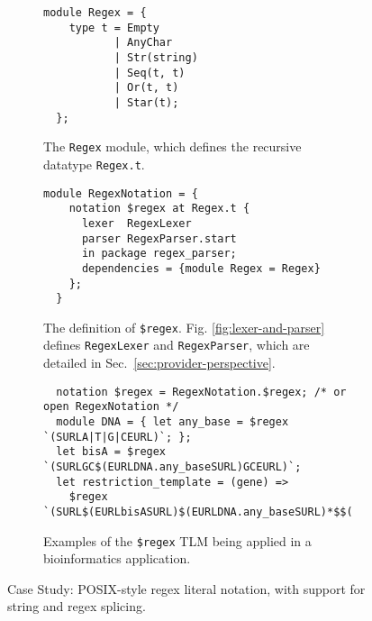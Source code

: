\documentclass[acmsmall]{acmart}
\newcommand{\li}[1]{\lstinline[basicstyle=\ttfamily\fontsize{9pt}{1em}\selectfont]{#1}}
\begin{document}
\begin{figure}[t]
\begin{subfigure}[t]{0.45\textwidth}
\vspace{-4px}
\begin{lstlisting}[mathescape=~]
  module Regex = {
    type t = Empty
           | AnyChar 
           | Str(string)
           | Seq(t, t) 
           | Or(t, t) 
           | Star(t);
  };
\end{lstlisting}
\vspace{-5px}
\caption{The \li{Regex} module, which defines the recursive datatype \li{Regex.t}.}
\label{fig:Regex-module-def}
\end{subfigure}
\hfill
\begin{subfigure}[t]{0.53\textwidth}
\vspace{-4px}
\begin{lstlisting}[mathescape=|]
  module RegexNotation = {
    notation $regex at Regex.t {
      lexer  RegexLexer
      parser RegexParser.start
      in package regex_parser;
      dependencies = {module Regex = Regex}
    };
  }
\end{lstlisting}
\vspace{-5px}
\caption{The definition of \li{$regex}. Fig. \ref{fig:lexer-and-parser} defines \li{RegexLexer} and \li{RegexParser}, which are detailed in Sec.~\ref{sec:provider-perspective}.}
\label{fig:regex-tlm-def}
\end{subfigure}

\begin{subfigure}[t]{\textwidth}
\vspace{7px}
\begin{lstlisting}
  notation $regex = RegexNotation.$regex; /* or open RegexNotation */
  module DNA = { let any_base = $regex `(SURLA|T|G|CEURL)`; };
  let bisA = $regex `(SURLGC$(EURLDNA.any_baseSURL)GCEURL)`;
  let restriction_template = (gene) => 
    $regex `(SURL$(EURLbisASURL)$(EURLDNA.any_baseSURL)*$$(EURLgeneSURL)$(EURLDNA.any_baseSURL)*$(EURLbisASURL)EURL)`;
\end{lstlisting}
\vspace{-4px}
\caption{Examples of the \li{$regex} TLM being applied in a bioinformatics application. %
}
\label{fig:first-tlm-example}
\end{subfigure}
\vspace{1px}
\caption{Case Study: POSIX-style regex literal notation, with support for string and regex splicing.}
\label{fig:regex-case-study}
\end{figure}
\end{document}
